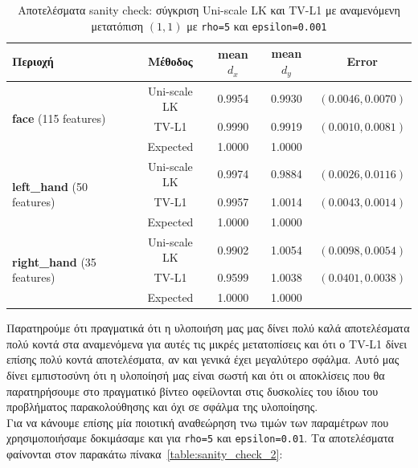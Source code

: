 \documentclass[12pt, a4paper]{article}
\begin{document}
\begin{table}[H]
\centering
\setlength{\tabcolsep}{6pt}
\begin{tabular}{lcccc}
\toprule
\textbf{Περιοχή} & \textbf{Μέθοδος} & \textbf{mean $d_x$} & \textbf{mean $d_y$} & \textbf{Error} \\
\midrule
\multirow{3}{*}{\textbf{face} (115 features)} & Uni-scale LK & 0.9954 & 0.9930 & $(0.0046, 0.0070)$ \\
 & TV-L1 & 0.9990 & 0.9919 & $(0.0010, 0.0081)$ \\
 & Expected & 1.0000 & 1.0000 & \\
\midrule
\multirow{3}{*}{\textbf{left\_hand} (50 features)} & Uni-scale LK & 0.9974 & 0.9884 & $(0.0026, 0.0116)$ \\
 & TV-L1 & 0.9957 & 1.0014 & $(0.0043, 0.0014)$ \\
 & Expected & 1.0000 & 1.0000 & \\
\midrule
\multirow{3}{*}{\textbf{right\_hand} (35 features)} & Uni-scale LK & 0.9902 & 1.0054 & $(0.0098, 0.0054)$ \\
 & TV-L1 & 0.9599 & 1.0038 & $(0.0401, 0.0038)$ \\
 & Expected & 1.0000 & 1.0000 & \\
\bottomrule
\end{tabular}
\caption{Αποτελέσματα sanity check: σύγκριση Uni-scale LK και TV-L1 με αναμενόμενη μετατόπιση $(1, 1)$ με \texttt{rho=5} και \texttt{epsilon=0.001}}
\label{table:sanity_check}
\end{table}
Παρατηρούμε ότι πραγματικά ότι η υλοποιήση μας μας δίνει πολύ καλά αποτελέσματα πολύ κοντά στα αναμενόμενα για αυτές τις μικρές μετατοπίσεις και ότι ο TV-L1 δίνει επίσης πολύ κοντά αποτελέσματα, αν και γενικά έχει μεγαλύτερο σφάλμα. Αυτό μας δίνει εμπιστοσύνη ότι η υλοποίησή μας είναι σωστή και ότι οι αποκλίσεις που θα παρατηρήσουμε στο πραγματικό βίντεο οφείλονται στις δυσκολίες του ίδιου του προβλήματος παρακολούθησης και όχι σε  σφάλμα της υλοποίησης.\\

Για να κάνουμε επίσης μία ποιοτική αναθεώρηση τνω τιμών των παραμέτρων που χρησιμοποιήσαμε δοκιμάσαμε και για \texttt{rho=5} και \texttt{epsilon=0.01}. Τα αποτελέσματα φαίνονται στον παρακάτω πίνακα~\ref{table:sanity_check_2}:
\end{document}
